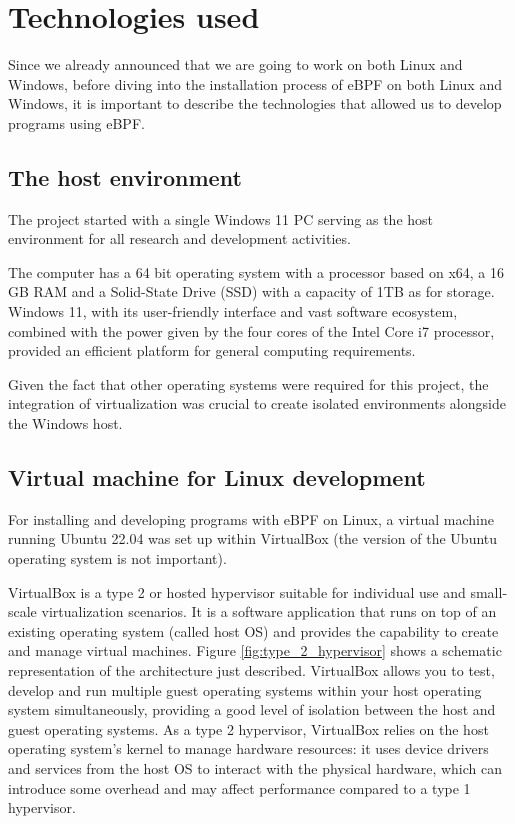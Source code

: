 \chapter{Technologies used}

Since we already announced that we are going to work on both Linux and Windows, before diving into the installation process of eBPF on both Linux and Windows, it is important to describe the technologies that allowed us to develop programs using eBPF.

\section{The host environment}

The project started with a single Windows 11 PC serving as the host environment for all research and development activities. 

The computer has a 64 bit operating system with a processor based on x64, a 16 GB RAM and a Solid-State Drive (SSD) with a capacity of 1TB as for storage.
Windows 11, with its user-friendly interface and vast software ecosystem, combined with the power given by the four cores of the Intel Core i7 processor, provided an efficient platform for general computing requirements.

Given the fact that other operating systems were required for this project, the integration of virtualization was crucial to create isolated environments alongside the Windows host.

\section{Virtual machine for Linux development}

For installing and developing programs with eBPF on Linux, a virtual machine running Ubuntu 22.04 was set up within VirtualBox (the version of the Ubuntu operating system is not important).

VirtualBox is a type 2 or hosted hypervisor suitable for individual use and small-scale virtualization scenarios.
It is a software application that runs on top of an existing operating system (called host OS) and provides the capability to create and manage virtual machines. 
Figure \ref{fig:type_2_hypervisor} shows a schematic representation of the architecture just described.
VirtualBox allows you to test, develop and run multiple guest operating systems within your host operating system simultaneously, providing a good level of isolation between the host and guest operating systems.
As a type 2 hypervisor, VirtualBox relies on the host operating system's kernel to manage hardware resources: it uses device drivers and services from the host OS to interact with the physical hardware, which can introduce some overhead and may affect performance compared to a type 1 hypervisor.

